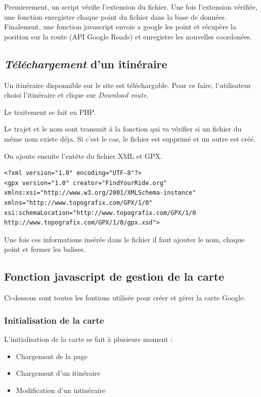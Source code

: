 \documentclass[a4paper]{article}
\newcommand{\bdd}{base de données}
\newcommand{\diag}[1]{}
\begin{document}
Premierement, un script vérifie l'extension du fichier. Une fois l'extension vérifiée, une fonction enregistre chaque point du fichier dans la \bdd. Finalement, une fonction javascript envoie a google les point et récupère la position sur la route (API Google Roads) et enregistre les nouvelles coordonées.

\begin{center}
	\diag{Gpx2Sql}
\end{center}


\subsection{\emph{Téléchargement} d'un itinéraire}
Un itinéraire disponnible sur le site est téléchargable.
Pour ce faire, l'utilisateur choisi l'itinéraire et clique sur \emph{Download route}.

Le traitement se fait en PHP.

Le trajet et le nom sont transmit à la fonction qui va  vérifier si un fichier du même nom existe déja. Si c'est le cas, le fichier est supprimé et un autre est créé. 

On ajoute ensuite l'entête du fichier XML et GPX.

\lstset{language=XML}
\begin{lstlisting}[frame=single] 
<?xml version="1.0" encoding="UTF-8"?>
<gpx version="1.0" creator="FindYourRide.org" xmlns:xsi="http://www.w3.org/2001/XMLSchema-instance" xmlns="http://www.topografix.com/GPX/1/0" xsi:schemaLocation="http://www.topografix.com/GPX/1/0 http://www.topografix.com/GPX/1/0/gpx.xsd">
\end{lstlisting}

Une fois ces informations insérée dans le fichier il faut ajouter le nom, chaque point et fermer les balises.

\begin{center}
	\diag{PathToGpx}
\end{center}


\subsection{Fonction javascript de gestion de la carte}
Ci-dessous sont toutes les fontions utilisée pour créer et gérer la carte Google.

\subsubsection{Initialisation de la carte}
L'initialisation de la carte se fait à plusieurs moment : 
\begin{itemize}
	\item Chargement de la page
	\item Chargement d'un itinéraire
	\item Modification d'un intinéraire
\end{itemize}
\end{document}
